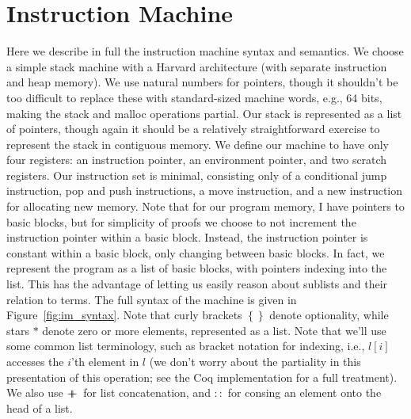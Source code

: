 \section{Instruction Machine} \label{sec:im_semantics}

Here we describe in full the instruction machine syntax and semantics. We choose a
simple stack machine with a Harvard architecture (with separate instruction and
heap memory). We use natural numbers for pointers, though it shouldn't be too
difficult to replace these with standard-sized machine words, e.g., 64 bits,
making the stack and malloc operations partial. Our stack is represented as a
list of pointers, though again it should be a relatively straightforward
exercise to represent the stack in contiguous memory. We define our machine to
have only four registers: an instruction pointer, an environment pointer, and
two scratch registers. Our instruction set is minimal, consisting only of a
conditional jump instruction, pop and push instructions, a move instruction, and
a new instruction for allocating new memory. Note that for our program memory, I
have pointers to basic blocks, but for simplicity of proofs we choose to not
increment the instruction pointer within a basic block.  Instead, the
instruction pointer is constant within a basic block, only changing between
basic blocks. In fact, we represent the program as a list of basic blocks, with
pointers indexing into the list. This has the advantage of letting us easily
reason about sublists and their relation to terms. The full syntax of the
machine is given in Figure~\ref{fig:im_syntax}. Note that curly brackets
$\left\{\right\}$ denote optionality, while stars $*$ denote zero or more
elements, represented as a list. Note that we'll use some common list
terminology, such as bracket notation for indexing, i.e., $l\left[i\right]$
accesses the $i$'th element in $l$ (we don't worry about the partiality in this
presentation of this operation; see the Coq implementation for a full
treatment). We also use $+\!\!\!\!+\,$ for list concatenation, and $::$ for consing an
element onto the head of a list. 

